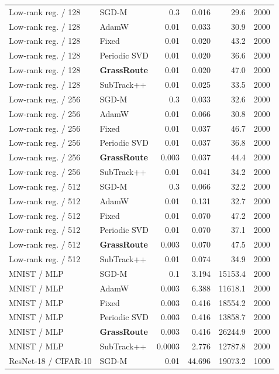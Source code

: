 {\begin{longtable}{llrrrr}
Low-rank reg. / 128 & SGD-M & 0.3 & 0.016 & 29.6 & 2000 \\
Low-rank reg. / 128 & AdamW & 0.01 & 0.033 & 30.9 & 2000 \\
Low-rank reg. / 128 & Fixed & 0.01 & 0.020 & 43.2 & 2000 \\
Low-rank reg. / 128 & Periodic SVD & 0.01 & 0.020 & 36.6 & 2000 \\
\rowcolor{oursbg}Low-rank reg. / 128 & \textbf{GrassRoute} & 0.01 & 0.020 & 47.0 & 2000 \\
Low-rank reg. / 128 & SubTrack++ & 0.01 & 0.025 & 33.5 & 2000 \\
Low-rank reg. / 256 & SGD-M & 0.3 & 0.033 & 32.6 & 2000 \\
Low-rank reg. / 256 & AdamW & 0.01 & 0.066 & 30.8 & 2000 \\
Low-rank reg. / 256 & Fixed & 0.01 & 0.037 & 46.7 & 2000 \\
Low-rank reg. / 256 & Periodic SVD & 0.01 & 0.037 & 36.8 & 2000 \\
\rowcolor{oursbg}Low-rank reg. / 256 & \textbf{GrassRoute} & 0.003 & 0.037 & 44.4 & 2000 \\
Low-rank reg. / 256 & SubTrack++ & 0.01 & 0.041 & 34.2 & 2000 \\
Low-rank reg. / 512 & SGD-M & 0.3 & 0.066 & 32.2 & 2000 \\
Low-rank reg. / 512 & AdamW & 0.01 & 0.131 & 32.7 & 2000 \\
Low-rank reg. / 512 & Fixed & 0.01 & 0.070 & 47.2 & 2000 \\
Low-rank reg. / 512 & Periodic SVD & 0.01 & 0.070 & 37.1 & 2000 \\
\rowcolor{oursbg}Low-rank reg. / 512 & \textbf{GrassRoute} & 0.003 & 0.070 & 47.5 & 2000 \\
Low-rank reg. / 512 & SubTrack++ & 0.01 & 0.074 & 34.9 & 2000 \\
MNIST / MLP & SGD-M & 0.1 & 3.194 & 15153.4 & 2000 \\
MNIST / MLP & AdamW & 0.003 & 6.388 & 11618.1 & 2000 \\
MNIST / MLP & Fixed & 0.003 & 0.416 & 18554.2 & 2000 \\
MNIST / MLP & Periodic SVD & 0.003 & 0.416 & 13858.7 & 2000 \\
\rowcolor{oursbg}MNIST / MLP & \textbf{GrassRoute} & 0.003 & 0.416 & 26244.9 & 2000 \\
MNIST / MLP & SubTrack++ & 0.0003 & 2.776 & 12787.8 & 2000 \\
ResNet-18 / CIFAR-10 & SGD-M & 0.01 & 44.696 & 19073.2 & 1000 \\

\end{longtable}}
